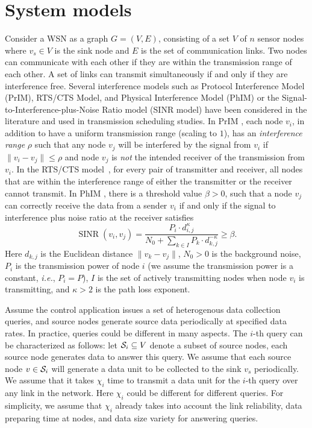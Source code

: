 \documentclass[conference,10pt]{IEEEtran}\usepackage{amsmath}
\DeclareMathOperator{\SINR}{SINR}
\def\sources{{\cal S}}
\def\processing{{\chi}}
\def\ie{\textit{i.e.}\xspace}
\def\pathloss{{\kappa}}
\begin{document}
\section{System models}
\label{sec:model}
Consider a WSN as a graph $G=(V,E)$, consisting of a set $V$ of $n$
 sensor nodes
 where $v_s\in V$ is the sink node and $E$ is the set of
 communication links.
Two nodes can communicate with each other {if}
 they are within the transmission range of each other.
A set of links can transmit simultaneously if and only if they are
 interference free.
 Several interference models such as Protocol Interference Model (PrIM),  RTS/CTS Model, and Physical
 Interference Model (PhIM) or the Signal-to-Interference-plus-Noise
 Ratio model (SINR model) have been considered in the literature and used in transmission
scheduling studies.
In PrIM \cite{gupta2000capacity}, each node
 $v_i$, in addition to have a uniform transmission range (scaling to $1$),
 has an \textit{interference range} $\rho$ such that
 any node $v_j$ will be interfered by the signal from
 $v_i$ if $\|v_i-v_j\| \le \rho$ and node $v_j$ is \emph{not}
 the intended receiver of the transmission from $v_i$.
In the RTS/CTS  model~\cite{alicherry2005joint}, for every
 pair of transmitter and receiver,
 all nodes that are within the interference range of either the transmitter
 or the receiver cannot transmit.
In PhIM \cite{goussevskaia2007complexity}, there is a threshold
value $\beta>0$,
 such that a node $v_j$ can correctly
 receive the data from a sender $v_i$ if and only if
 the signal to interference plus noise ratio at the receiver satisfies
 \[\SINR (v_i, v_j) =\frac{P_i\cdot d^{\pathloss}_{i,j}}{ N_0+ \sum_{k\in I}P_k\cdot d^{-\pathloss}_{k,j}}\ge\beta.\]
Here
 $d_{k,j}$ is the Euclidean distance $\|v_k-v_j\|$, $N_{0}> 0$ is the
 background noise, $P_i$ is the
 transmission power of node $i$ (we assume the transmission power is a
 constant, \ie, $P_i=P$), $I$
 is the set of actively transmitting nodes when node $v_i$ is
 transmitting, and $\pathloss > 2$ is the path loss exponent.

Assume the control application issues a set
 of heterogenous  data collection queries, and
 source nodes generate source data periodically at specified
 data rates.
 In practice, queries could be different in many aspects.
The $i$-th query can be characterized as follows: let $\sources_i
\subseteq V$ denote a subset of source nodes, each source node generates data to
answer this query. We assume that each source node $v\in\sources_i$
 will generate a data unit to be
 collected to the sink $v_s$ periodically.
We assume that it takes $\processing_i$ time to transmit a data unit
for the $i$-th query over any link in the network. Here
$\processing_i$ could be different for different queries. For
simplicity, we assume that $\processing_i$ already takes into
account the link reliability, data preparing time at nodes,  and
data size variety for answering queries.
\end{document}

